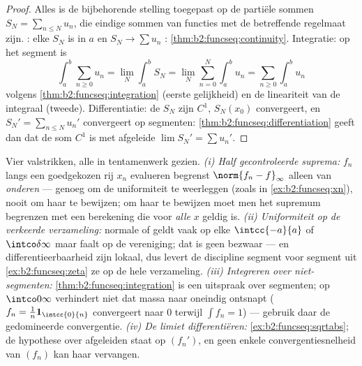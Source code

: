 \begin{proof}
Alles is de bijbehorende stelling toegepast op de partiële sommen
$S_N = \sum_{n\leq N}u_n$, die eindige sommen van functies met de
betreffende regelmaat zijn. : elke $S_N$ is  in
$a$ en $S_N \to \sum u_n$ :
\cref{thm:b2:funcseq:continuity}. Integratie: op het segment is
\[
\int_a^b \sum_{n\geq0} u_n
= \lim_N \int_a^b S_N
= \lim_N \sum_{n=0}^{N}\int_a^b u_n
= \sum_{n\geq0}\int_a^b u_n
\]
volgens \cref{thm:b2:funcseq:integration} (eerste gelijkheid) en
de lineariteit van de integraal (tweede). Differentiatie: de $S_N$
zijn $C^1$, $S_N(x_0)$ convergeert, en $S_N' = \sum_{n\leq N}u_n'$
convergeert  op segmenten:
\cref{thm:b2:funcseq:differentiation} geeft dan dat de som $C^1$ is
met afgeleide $\lim S_N' = \sum u_n'$.
\end{proof}

\begin{remark}
Vier valstrikken, alle in tentamenwerk gezien. \emph{(i) Half
gecontroleerde suprema:} $f_n$ langs een goedgekozen rij $x_n$
evalueren begrenst $\norm{f_n - f}_\infty$ alleen van
\emph{onderen} --- genoeg om de uniformiteit te weerleggen (zoals
in \cref{ex:b2:funcseq:xn}), nooit om haar te bewijzen; om haar te
bewijzen moet men het supremum begrenzen met een berekening die
voor \emph{alle} $x$ geldig is. \emph{(ii) Uniformiteit op de
verkeerde verzameling:} normale of  geldt vaak
op elke $\intcc{-a}{a}$ of $\intco\delta\infty$ maar faalt op de
 vereniging; dat is geen bezwaar ---  en
differentieerbaarheid zijn lokaal, dus levert de discipline segment
voor segment uit \cref{ex:b2:funcseq:zeta} ze op de hele 
verzameling. \emph{(iii) Integreren over niet-segmenten:}
\cref{thm:b2:funcseq:integration} is een uitspraak over segmenten;
op $\intco0\infty$ verhindert  niet dat massa
naar oneindig ontsnapt ($f_n = \frac1n\mathbf 1_{\intcc{0}{n}}$
convergeert  naar $0$ terwijl $\int f_n = 1$) --- gebruik
daar de gedomineerde convergentie. \emph{(iv) De limiet
differentiëren:} \cref{ex:b2:funcseq:sqrtabs}; de hypothese over
afgeleiden staat op $(f_n')$, en geen enkele
convergentiesnelheid van $(f_n)$ kan haar vervangen.
\end{remark}

